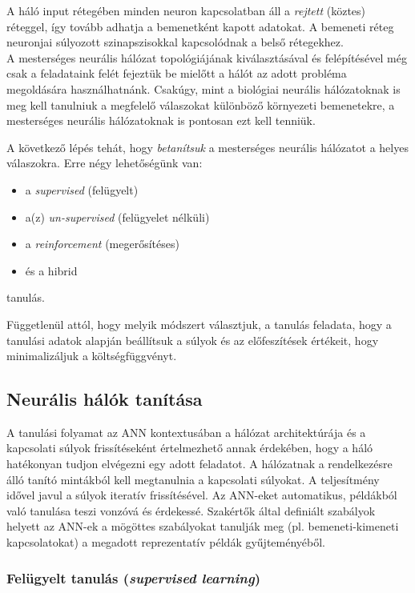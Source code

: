 \documentclass[12pt,a4]{article}
\begin{document}
	A háló input rétegében minden neuron kapcsolatban áll a \textit{rejtett} (köztes) réteggel, így tovább adhatja a bemenetként kapott adatokat. A bemeneti réteg neuronjai súlyozott szinapszisokkal kapcsolódnak a belső rétegekhez.\\
	
	A mesterséges neurális hálózat 
	topológiájának kiválasztásával és 
	felépítésével még csak a feladataink 
	felét fejeztük be mielőtt a hálót az 
	adott probléma megoldására használhatnánk.
	Csakúgy, mint a biológiai neurális hálózatoknak
	is meg kell tanulniuk a megfelelő válaszokat különböző környezeti bemenetekre, a mesterséges neurális hálózatoknak is pontosan ezt kell tenniük.
	
	
	A következő lépés tehát, hogy \textit{betanítsuk} a mesterséges neurális hálózatot a helyes válaszokra.
	Erre négy lehetőségünk van:
	\begin{itemize}
		\item a \textit{supervised} (felügyelt)
		\item a(z) \textit{un-supervised} (felügyelet nélküli)
		\item a \textit{reinforcement} (megerősítéses) 
		\item és a hibrid
	\end{itemize}
	tanulás.
	
	 Függetlenül attól, hogy melyik módszert választjuk, a tanulás feladata, hogy a tanulási adatok alapján beállítsuk a súlyok és az előfeszítések értékeit, hogy minimalizáljuk a 
	költségfüggvényt.
	
	\subsection{Neurális hálók tanítása}
	
	A tanulási folyamat \cite{ann2} az ANN kontextusában a
	hálózat architektúrája és a kapcsolati súlyok frissítéseként értelmezhető annak érdekében, hogy a háló hatékonyan tudjon elvégezni egy adott feladatot.
	A hálózatnak a rendelkezésre álló tanító mintákból kell megtanulnia a kapcsolati súlyokat. A teljesítmény idővel javul a súlyok iteratív frissítésével.
	Az ANN-eket automatikus, példákból való tanulása teszi 
	vonzóvá és érdekessé. Szakértők által definiált szabályok helyett az ANN-ek a mögöttes szabályokat tanulják meg (pl. bemeneti-kimeneti kapcsolatokat) a megadott reprezentatív példák gyűjteményéből.
	
	\subsubsection{Felügyelt tanulás (\textit{supervised learning})}
	
\end{document}
